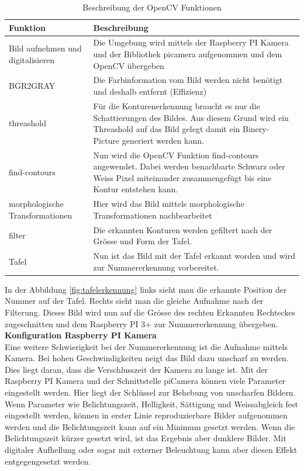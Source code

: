 \documentclass[../../main.tex]{subfiles}
\begin{document}
    \begin{table}[H]
        \begin{flushleft}
            \begin{tabular}{ | p{3cm} | p{10.5cm} |}
                \hline
                \textbf{Funktion}  & \textbf{Beschreibung} \\\hline
                Bild aufnehmen und digitalisieren & Die Umgebung wird mittels der Raspberry PI Kamera und der Bibliothek picamera aufgenommen und dem OpenCV übergeben \\\hline
                BGR2GRAY & Die Farbinformation vom Bild werden nicht benötigt und deshalb entfernt (Effizienz) \\ \hline
                threashold & Für die Konturenerkennung braucht es nur die Schattierungen des Bildes. Aus diesem Grund wird ein Threashold auf das Bild gelegt damit ein Binery- Picture generiert werden kann. \\ \hline
                find-contours & Nun wird die OpenCV Funktion find-contours angewendet. Dabei werden benachbarte Schwarz oder Weiss Pixel miteinander zusammengefügt bis eine Kontur entstehen kann. \\ \hline
                morphologische Transformationen & Hier wird das Bild mittels morphologische Transformationen nachbearbeitet \\ \hline
                filter & Die erkannten Konturen werden gefiltert nach der Grösse und Form der Tafel. \\ \hline
                Tafel & Nun ist das Bild mit der Tafel erkannt worden und wird zur Nummererkennung vorbereitet. \\ \hline
            \end{tabular}
        \end{flushleft}
        \caption{Beschreibung der OpenCV Funktionen}
        \label{tab:OpenCV_Funktionen_Tafelerkennung}
     \end{table}

     In der Abbildung \ref{fig:tafelerkennung} links sieht man die erkannte Position der Nummer auf der Tafel. Rechts sieht man die gleiche Aufnahme nach der Filterung. Dieses Bild wird nun auf die Grösse des rechten Erkannten Rechteckes zugeschnitten und dem Raspberry PI 3+ zur Nummererkennung übergeben.\\

     \textbf{Konfiguration Raspberry PI Kamera}\\
     Eine weitere Schwierigkeit bei der Nummererkennung ist die Aufnahme mittels Kamera. Bei hohen Geschwindigkeiten neigt das Bild dazu unscharf zu werden. Dies liegt daran, dass die Verschlusszeit der Kamera zu lange ist. Mit der Raspberry PI Kamera und der Schnittstelle piCamera können viele Parameter eingestellt werden. Hier liegt der Schlüssel zur Behebung von unscharfen Bildern. Wenn Parameter wie Belichtungszeit, Helligkeit, Sättigung und Weissabgleich fest eingestellt werden, können in erster Linie reproduzierbare Bilder aufgenommen werden und die Belichtungszeit kann auf ein Minimum gesetzt werden. Wenn die Belichtungszeit kürzer gesetzt wird, ist das Ergebnis aber dunklere Bilder. Mit digitaler Aufhellung oder sogar mit externer Beleuchtung kann aber diesen Effekt entgegengesetzt werden. 
\end{document}
